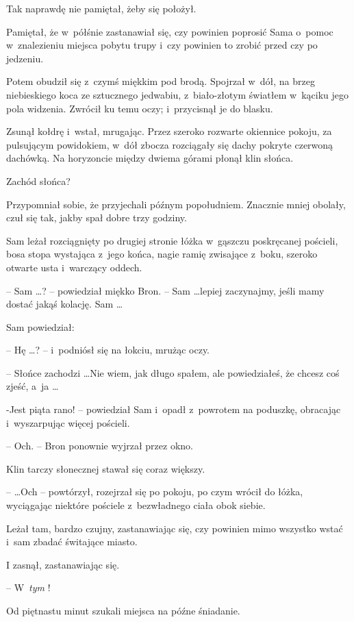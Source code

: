 \documentclass[oneside,polish,11pt,rmheadings]{mwbk}
\begin{document}
Tak naprawdę nie pamiętał, żeby się położył. 

Pamiętał, że w~półśnie zastanawiał się, czy powinien poprosić Sama o~pomoc w~znalezieniu miejsca pobytu trupy i~czy powinien to zrobić przed czy po jedzeniu. 

Potem obudził się z~czymś miękkim pod brodą. Spojrzał w~dół, na brzeg niebieskiego koca ze sztucznego jedwabiu, z~biało-złotym światłem w~kąciku jego pola widzenia. Zwrócił ku temu oczy; i~przycisnął je do blasku. 

Zsunął kołdrę i~wstał, mrugając. Przez szeroko rozwarte okiennice pokoju, za pulsującym powidokiem, w~dół zbocza rozciągały się dachy pokryte czerwoną dachówką. Na horyzoncie między dwiema górami płonął klin słońca. 

Zachód słońca? 

Przypomniał sobie, że przyjechali późnym popołudniem. Znacznie mniej obolały, czuł się tak, jakby spał dobre trzy godziny. 

Sam leżał rozciągnięty po drugiej stronie łóżka w~gąszczu poskręcanej pościeli, bosa stopa wystająca z~jego końca, nagie ramię zwisające z~boku, szeroko otwarte usta i~warczący oddech. 

-- Sam \ldots ? -- powiedział miękko Bron. -- Sam \ldots  lepiej zaczynajmy, jeśli mamy dostać jakąś kolację. Sam \ldots  

Sam powiedział:

 -- Hę \ldots ? -- i~podniósł się na łokciu, mrużąc oczy. 

-- Słońce zachodzi \ldots  Nie wiem, jak długo spałem, ale powiedziałeś, że chcesz coś zjeść, a~ja \ldots  

-Jest piąta rano!  -- powiedział Sam i~opadł z~powrotem na poduszkę, obracając i~wyszarpując więcej pościeli. 

-- Och. -- Bron ponownie wyjrzał przez okno. 

Klin tarczy słonecznej stawał się coraz większy. 

--  \ldots  Och -- powtórzył, rozejrzał się po pokoju, po czym wrócił do łóżka, wyciągając niektóre pościele z~bezwładnego ciała obok siebie. 

Leżał tam, bardzo czujny, zastanawiając się, czy powinien mimo wszystko wstać i~sam zbadać świtające miasto. 

I zasnął, zastanawiając się. 

\bigskip

-- W~\textit{tym }!  

Od piętnastu minut szukali miejsca na późne śniadanie. 
\end{document}
